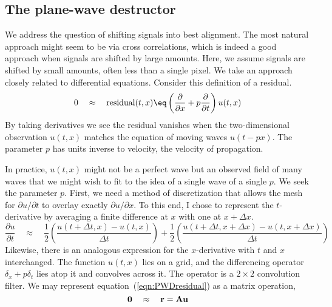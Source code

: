 %	
	
%

\subsection{The plane-wave destructor}
%
We address the question of shifting signals into best alignment. The
most natural approach might seem to be via cross correlations, which
is indeed a good approach when signals are shifted by large amounts.
Here, we assume signals are shifted by small amounts, often less than a
single pixel.  We take an approach closely related to differential
equations. Consider this definition of a residual.
\begin{equation}
0 \quad \approx \quad \hbox{residual}(t,x) \eq \left( \frac{\partial}{\partial x} + p \frac{\partial}{\partial t} \right) u(t,x)
\label{eqn:PWDresidual}
\end{equation}
By taking derivatives we see the residual vanishes when the two-dimensional observation $u(t,x)$ matches the equation of moving waves $u(t-px)$.  The parameter $p$ has units inverse to velocity, the velocity of propagation. 
\par
In practice, $u(t,x)$ might not be a perfect wave but an observed field of many waves that we might wish to fit to the idea of a single wave of a single $p$. We seek the parameter $p$.  First, we need a method of discretization that allows the mesh for $\partial u/\partial t$ to overlay exactly $\partial u /\partial x$.  To this end, I chose to represent the $t$-derivative by averaging a finite difference at $x$ with one at $x+\Delta x$. 
\begin{equation}
\frac{\partial u}{\partial t} \quad \approx \quad \frac{1}{2} 
\left(
\frac{u(t+\Delta t,x) - u(t,x) }{\Delta t}
\right) + \frac{1}{2}
\left(
\frac{u(t+\Delta t,x+\Delta x) - u(t,x+\Delta x) }{\Delta t}
\right)
\end{equation}
Likewise, there is an analogous expression for the $x$-derivative with $t$ and $x$ interchanged.
The function $u(t,x)$ lies on a grid, and the
differencing operator $\delta_x + p\delta_t$ lies atop it and convolves across it.
The operator is a $2\times 2$ convolution filter.
We may represent equation~(\ref{eqn:PWDresidual}) as a matrix operation,
\begin{equation}
{\bf 0} \quad \approx\quad  {\bf r} = {\bf A}{\bf u}
\end{equation}
